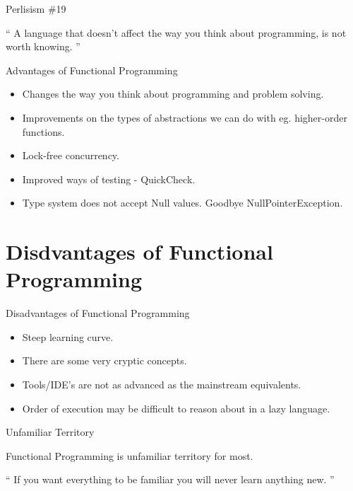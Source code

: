 \documentclass{beamer}
\begin{document}
\begin{frame}{Perlisism \#19}

\begin{exampleblock}{}
  {\Large ``
    A language that doesn't affect the way you think about programming, is not worth knowing.
  ''}
  \vskip5mm
  \hspace*{}
\end{exampleblock}

\end{frame}

\begin{frame}{Advantages of Functional Programming}

  \begin{itemize}[<+->]
  \item Changes the way you think about programming and problem solving.
  \item Improvements on the types of abstractions we can do with eg.
    higher-order functions.
  \item Lock-free concurrency.
  \item Improved ways of testing - QuickCheck.
  \item Type system does not accept Null values. Goodbye NullPointerException.
  \end{itemize}

\end{frame}

\section{Disdvantages of Functional Programming}

\begin{frame}{Disadvantages of Functional Programming}

  \begin{itemize}[<+->]
  \item Steep learning curve.
  \item There are some very cryptic concepts.
  \item Tools/IDE's are not as advanced as the mainstream equivalents.
  \item Order of execution may be difficult to reason about in a lazy language.
  \end{itemize}

\end{frame}


\begin{frame}{Unfamiliar Territory}

  {\Large Functional Programming is unfamiliar territory for most.}

\begin{exampleblock}{}
  {\Large ``
    If you want everything to be familiar you will never learn anything new.
  ''}
  \vskip5mm
  \hspace*{}
\end{exampleblock}

\end{frame}
\end{document}
